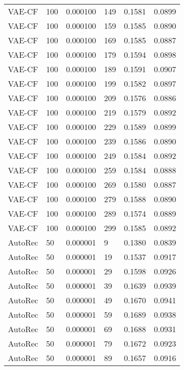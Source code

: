 \begin{tabular}{llrlrr}
  VAE-CF &  100 &  0.000100 &   149 &  0.1581 &       0.0899 \\
  VAE-CF &  100 &  0.000100 &   159 &  0.1585 &       0.0890 \\
  VAE-CF &  100 &  0.000100 &   169 &  0.1585 &       0.0887 \\
  VAE-CF &  100 &  0.000100 &   179 &  0.1594 &       0.0898 \\
  VAE-CF &  100 &  0.000100 &   189 &  0.1591 &       0.0907 \\
  VAE-CF &  100 &  0.000100 &   199 &  0.1582 &       0.0897 \\
  VAE-CF &  100 &  0.000100 &   209 &  0.1576 &       0.0886 \\
  VAE-CF &  100 &  0.000100 &   219 &  0.1579 &       0.0892 \\
  VAE-CF &  100 &  0.000100 &   229 &  0.1589 &       0.0899 \\
  VAE-CF &  100 &  0.000100 &   239 &  0.1586 &       0.0890 \\
  VAE-CF &  100 &  0.000100 &   249 &  0.1584 &       0.0892 \\
  VAE-CF &  100 &  0.000100 &   259 &  0.1584 &       0.0888 \\
  VAE-CF &  100 &  0.000100 &   269 &  0.1580 &       0.0887 \\
  VAE-CF &  100 &  0.000100 &   279 &  0.1588 &       0.0890 \\
  VAE-CF &  100 &  0.000100 &   289 &  0.1574 &       0.0889 \\
  VAE-CF &  100 &  0.000100 &   299 &  0.1585 &       0.0892 \\
 AutoRec &   50 &  0.000001 &     9 &  0.1380 &       0.0839 \\
 AutoRec &   50 &  0.000001 &    19 &  0.1537 &       0.0917 \\
 AutoRec &   50 &  0.000001 &    29 &  0.1598 &       0.0926 \\
 AutoRec &   50 &  0.000001 &    39 &  0.1639 &       0.0939 \\
 AutoRec &   50 &  0.000001 &    49 &  0.1670 &       0.0941 \\
 AutoRec &   50 &  0.000001 &    59 &  0.1689 &       0.0938 \\
 AutoRec &   50 &  0.000001 &    69 &  0.1688 &       0.0931 \\
 AutoRec &   50 &  0.000001 &    79 &  0.1672 &       0.0923 \\
 AutoRec &   50 &  0.000001 &    89 &  0.1657 &       0.0916 \\

\end{tabular}
